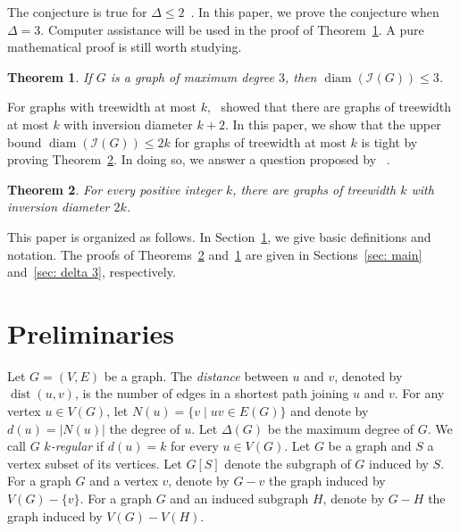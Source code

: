 \documentclass[
final
]{dmtcs-episciences}
\DeclareMathOperator{\diam}{\mathrm{diam}}
\DeclareMathOperator{\dist}{\mathrm{dist}}
\newtheorem{theorem}{Theorem}[section]
\begin{document}
The conjecture is true for $\Delta \le 2$~\cite{havet2024diameter}.
In this paper, we prove the conjecture when $\Delta = 3$.
Computer assistance will be used in the proof of Theorem~\ref{thm: Delta 3 diam}.
A pure mathematical proof is still worth studying.

\begin{theorem}\label{thm: Delta 3 diam}
If $G$ is a graph of maximum degree $3$, then $\diam(\mathcal{I}(G)) \le 3$.
\end{theorem}





For graphs with treewidth at most $k$,~\cite{havet2024diameter} showed that there are graphs of treewidth at most $k$ with inversion diameter $k+2$.
In this paper, we show that the upper bound $\diam(\mathcal{I}(G)) \le 2k$ for graphs of treewidth at most $k$ is tight by proving Theorem~\ref{thm: main}. In doing so, we answer a question proposed by ~\cite{havet2024diameter}.

\begin{theorem}\label{thm: main}
    For every positive integer $k$, there are graphs of treewidth $k$ with inversion diameter $2k$.
\end{theorem}


This paper is organized as follows.
In Section~\ref{sec: preliminary}, we give basic definitions and notation. The proofs of Theorems~\ref{thm: main} and~\ref{thm: Delta 3 diam} are given
in Sections~\ref{sec: main} and~\ref{sec: delta 3}, respectively.


\section{Preliminaries}\label{sec: preliminary}

Let $G=(V,E)$ be a graph. The \emph{distance} between $u$ and $v$, denoted by $\dist(u,v)$, is the number of edges in a shortest path joining $u$ and $v$. For any vertex $u\in V(G)$, let $N(u)=\{v \mid uv\in E(G)\}$ and denote by $d(u)=|N(u)|$ the degree of $u$. Let $\Delta(G)$  be the maximum degree of $G$. We call $G$ \emph{$k$-regular} if $d(u)=k$ for every $u\in V(G)$. Let $G$ be a graph and $S$ a vertex subset of its vertices. 
Let $G[S]$ denote the subgraph of $G$ induced by $S$.
For a graph $G$ and a vertex $v$, denote by $G-v$  the graph induced by $V(G) - \{v\}$.
For a graph $G$ and an induced subgraph $H$, denote by $G-H$  the graph induced by $V(G) - V(H)$. 
\end{document}
